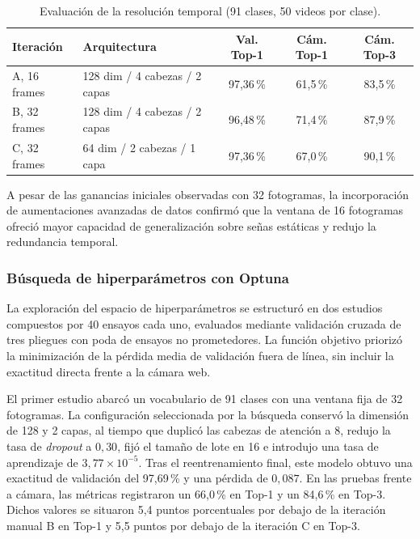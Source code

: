 \begin{table}[H]
    \centering
    \small
    \caption{Evaluación de la resolución temporal (91 clases, 50 videos por clase).}
    \label{tab:evaluacion_frames}
    \begin{tabularx}{\textwidth}{l X ccc}
        \toprule
        \textbf{Iteración} & \textbf{Arquitectura} & \textbf{Val. Top-1} & \textbf{Cám. Top-1} & \textbf{Cám. Top-3} \\
        \midrule
        A, 16 frames & 128 dim / 4 cabezas / 2 capas & 97{,}36\,\% & 61{,}5\,\% & 83{,}5\,\% \\
        B, 32 frames & 128 dim / 4 cabezas / 2 capas & 96{,}48\,\% & 71{,}4\,\% & 87{,}9\,\% \\
        C, 32 frames & 64 dim / 2 cabezas / 1 capa   & 97{,}36\,\% & 67{,}0\,\% & 90{,}1\,\% \\
        \bottomrule
    \end{tabularx}
\end{table}

A pesar de las ganancias iniciales observadas con 32 fotogramas, la incorporación de aumentaciones avanzadas de datos confirmó que la ventana de 16 fotogramas ofreció mayor capacidad de generalización sobre señas estáticas y redujo la redundancia temporal.

\subsubsection{Búsqueda de hiperparámetros con Optuna}

La exploración del espacio de hiperparámetros se estructuró en dos estudios compuestos por 40 ensayos cada uno, evaluados mediante validación cruzada de tres pliegues con poda de ensayos no prometedores. La función objetivo priorizó la minimización de la pérdida media de validación fuera de línea, sin incluir la exactitud directa frente a la cámara web.

El primer estudio abarcó un vocabulario de 91 clases con una ventana fija de 32 fotogramas. La configuración seleccionada por la búsqueda conservó la dimensión de 128 y 2 capas, al tiempo que duplicó las cabezas de atención a 8, redujo la tasa de \textit{dropout} a $0{,}30$, fijó el tamaño de lote en 16 e introdujo una tasa de aprendizaje de $3{,}77\times 10^{-5}$. Tras el reentrenamiento final, este modelo obtuvo una exactitud de validación del 97{,}69\,\% y una pérdida de $0{,}087$. En las pruebas frente a cámara, las métricas registraron un 66{,}0\,\% en Top-1 y un 84{,}6\,\% en Top-3. Dichos valores se situaron 5,4 puntos porcentuales por debajo de la iteración manual B en Top-1 y 5,5 puntos por debajo de la iteración C en Top-3.

